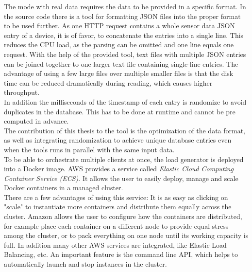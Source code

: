 The mode with real data requires the data to be provided in a specific format.
In the source code there is a tool for formatting JSON files into the proper format to be used further.
As one HTTP request contains a whole sensor data JSON entry of a device, it is of favor, to concatenate the entries into a single line.
This reduces the CPU load, as the parsing can be omitted and one line equals one request.
With the help of the provided tool, text files with multiple JSON entries can be joined together to one larger text file containing single-line entries.
The advantage of using a few large files over multiple smaller files is that the disk time can be reduced dramatically during reading, which causes higher throughput.\\
In addition the milliseconds of the timestamp of each entry is randomize to avoid duplicates in the database.
This has to be done at runtime and cannot be pre computed in advance.\\

The contribution of this thesis to the tool is the optimization of the data format, as well as integrating randomization to achieve unique database entries even when the tools runs in parallel with the same input data.\\

To be able to orchestrate multiple clients at once, the load generator is deployed into a Docker image.
AWS provides a service called \textit{Elastic Cloud Computing Container Service (ECS)}.
It allows the user to easily deploy, manage and scale Docker containers in a managed cluster.\\
There are a few advantages of using this service: It is as easy as clicking on "scale" to instantiate more containers and distribute them equally across the cluster.
Amazon allows the user to configure how the containers are distributed, for example place each container on a different node to provide equal stress among the cluster, or to pack everything on one node until its working capacity is full.
In addition many other AWS services are integrated, like Elastic Load Balancing, etc.
An important feature is the command line API, which helps to automatically launch and stop instances in the cluster.\\

